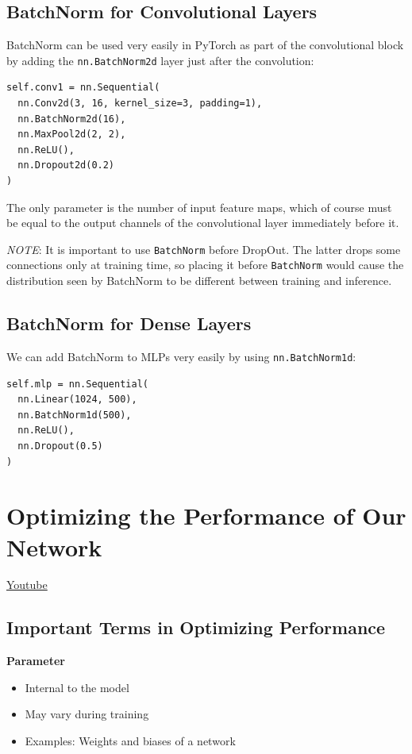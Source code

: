 \subsection{BatchNorm for Convolutional Layers}

BatchNorm can be used very easily in PyTorch as part of the convolutional block by adding the \lstinline|nn.BatchNorm2d| layer just after the convolution:
\begin{lstlisting}
self.conv1 = nn.Sequential(
  nn.Conv2d(3, 16, kernel_size=3, padding=1),
  nn.BatchNorm2d(16),
  nn.MaxPool2d(2, 2),
  nn.ReLU(),
  nn.Dropout2d(0.2)
)
\end{lstlisting}
The only parameter is the number of input feature maps, which of course must be equal to the output channels of the convolutional layer immediately before it.

\textit{NOTE}: It is important to use \lstinline|BatchNorm| before DropOut. The latter drops some connections only at training time, so placing it before \lstinline|BatchNorm| would cause the distribution seen by BatchNorm to be different between training and inference.

\subsection{BatchNorm for Dense Layers}

We can add BatchNorm to MLPs very easily by using \lstinline|nn.BatchNorm1d|:
\begin{lstlisting}
self.mlp = nn.Sequential(
  nn.Linear(1024, 500),
  nn.BatchNorm1d(500),
  nn.ReLU(),
  nn.Dropout(0.5)
)
\end{lstlisting}

\section{Optimizing the Performance of Our Network}
\href{https://www.youtube.com/watch?v=8YpN0GxOKmw&ab_channel=Udacity}{Youtube}

\subsection{Important Terms in Optimizing Performance}

\textbf{Parameter}
\begin{itemize}
    \item Internal to the model
    \item May vary during training
    \item Examples: Weights and biases of a network
\end{itemize}

